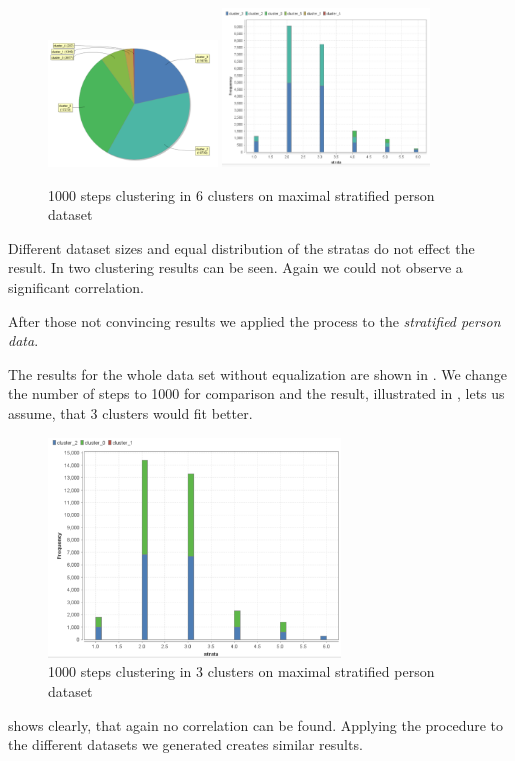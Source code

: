 \begin{figure}[H]
	\centering
	\includegraphics[width=0.4\textwidth]{vectorclusteringcluster1000.PNG}
	\includegraphics[width=0.49\textwidth]{vectorClustering1000.PNG}
	\caption{1000 steps clustering in 6 clusters on maximal stratified person dataset}
	\label{fig:1000vect}
\end{figure}

Different dataset sizes and equal distribution of the stratas do not effect the result. In   two clustering results can be seen. Again we could not observe a significant correlation.

After those not convincing results we applied the process to the \textit{stratified person data}.



The results for the whole data set without equalization are shown in . We change the number of steps to 1000 for comparison and the result, illustrated in , lets us assume, that 3 clusters would fit better. 


\begin{figure}[!htbp]
\centering
\includegraphics[width=0.69\textwidth]{vectorClustering31000.PNG}
\caption{1000 steps clustering in 3 clusters on maximal stratified person dataset}
\label{fig:1000vect3}
\end{figure}

 shows clearly, that again no correlation can be found. Applying the procedure to the different datasets we generated creates similar results.


